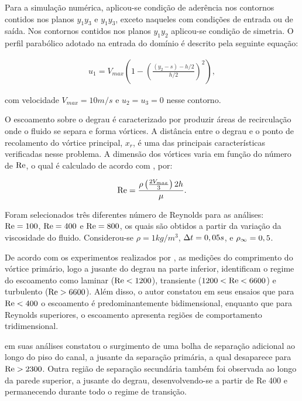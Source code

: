 \documentclass[tese_patricia]{subfiles}
\begin{document}
Para a simulação numérica, aplicou-se condição de aderência nos contornos contidos nos planos $y_1$$y_3$ e $y_1$$y_3$, exceto naqueles com condições de entrada ou de saída. Nos contornos contidos nos planos $y_1$$y_2$ aplicou-se condição de simetria. O perfil parabólico adotado na entrada do domínio é descrito pela seguinte equação:

\begin{align}
u_{1} = V_{max} \left(1-\left(\frac{\left(y_2-s\right)-h/2}{h/2}\right)^{2}\right),
\end{align}

\noindent com velocidade $V_{max} = 10 m/s$ e $u_{2} = u_{3} = 0$ nesse contorno.

O escoamento sobre o degrau é caracterizado por produzir áreas de recirculação onde o fluido se separa e forma vórtices. A distância entre o degrau e o ponto de recolamento do vórtice principal, $x_{r}$, é uma das principais características verificadas nesse problema. A dimensão dos vórtices varia em função do número de $\mathrm{Re}$, o qual é calculado de acordo com , por:

\begin{align}
\mathrm{Re} =\frac{\rho\left(\frac{2V_{max}}{3}\right)2h}{\mu}.
\end{align}

Foram selecionados três diferentes número de Reynolds para as análises: $\mathrm{Re} = 100$, $\mathrm{Re} = 400$ e $\mathrm{Re} = 800$, os quais são obtidos a partir da variação da viscosidade do fluido. Considerou-se  $\rho = 1kg/m^{3}$, $\Delta t = 0,05s$, e $\rho_\infty = 0,5$.

De acordo com os experimentos realizados por , as medições do comprimento do vórtice primário, logo a jusante do degrau na parte inferior, identificam o regime do escoamento como laminar ($\mathrm{Re} < 1200$), transiente ($1200 < \mathrm{Re} < 6600$) e turbulento ($\mathrm{Re} > 6600$). Além disso, o autor constatou em seus ensaios que para $\mathrm{Re} < 400$ o escoamento é predominantemente bidimensional, enquanto que para Reynolds superiores,  o escoamento apresenta regiões de comportamento tridimensional. 

 em suas análises constatou o surgimento de uma bolha de separação adicional ao longo do piso do canal, a jusante da separação primária, a qual desaparece para $\mathrm{Re} > 2300$. Outra região de separação secundária também foi observada ao longo da parede superior, a jusante do degrau, desenvolvendo-se a partir de Re 400 e permanecendo durante todo o regime de transição.
\end{document}
